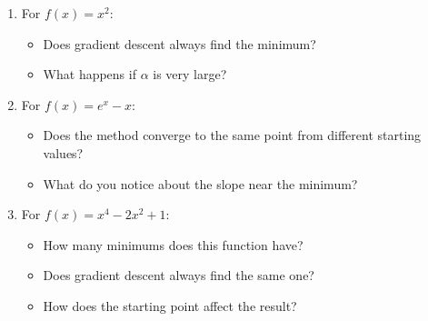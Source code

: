 \documentclass[11pt]{article}
\begin{document}
\begin{enumerate}

    \item For $f(x) = x^2$:
    \begin{itemize}
        \item Does gradient descent always find the minimum?
         \vspace{2cm}
        
        \item What happens if $\alpha$ is very large?
    \end{itemize}
    \vspace{2cm}

    \item For $f(x) = e^x - x$:
    \begin{itemize}
        \item Does the method converge to the same point from different starting values?
        \vspace{2cm}
        
        \item What do you notice about the slope near the minimum?
    \end{itemize}
    \vspace{2cm}

    \item For $f(x) = x^4 - 2x^2 + 1$:
    \begin{itemize}
        \item How many minimums does this function have?
         \vspace{2cm}
        
        \item Does gradient descent always find the same one?
         \vspace{2cm}
        
        \item How does the starting point affect the result?
    \end{itemize}

\end{enumerate}








\end{document}
